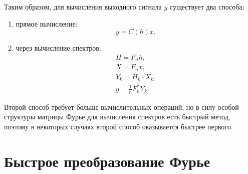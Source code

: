 Таким образом, для вычисления выходного сигнала $y$ существует два способа:
\begin{enumerate}
    \item прямое вычисление:
          \[
              y = C(h) x,
          \]
    \item через вычисление спектров:
          \begin{gather*}
              H = F_n h, \\
              X = F_n x, \\
              Y_k = H_k \cdot X_k, \\
              y = \frac{1}{n} F_n^* Y_k .
          \end{gather*}
\end{enumerate}
Второй способ требует больше вычислительных операций, но в силу особой структуры матрицы Фурье для вычисления спектров есть быстрый метод, поэтому в некоторых случаях второй способ
оказывается быстрее первого.


\section{Быстрое преобразование Фурье}

